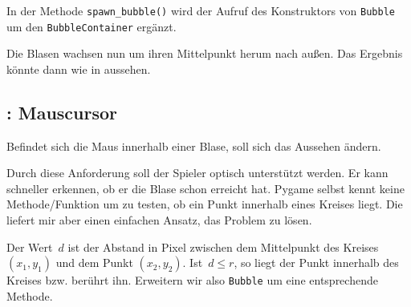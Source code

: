 
In der Methode \texttt{spawn\_bubble()} wird der Aufruf des Konstruktors von \texttt{Bubble} um den \texttt{BubbleContainer} ergänzt.


Die Blasen wachsen nun um ihren Mittelpunkt herum nach außen. Das Ergebnis könnte dann wie in  aussehen.


\subsection{: Mauscursor}
    Befindet sich die Maus innerhalb einer Blase, soll sich das Aussehen ändern.
\er

Durch diese Anforderung soll der Spieler optisch unterstützt werden. Er kann schneller erkennen, ob er die Blase schon erreicht hat. Pygame selbst kennt keine Methode/Funktion um zu testen, ob ein Punkt innerhalb eines Kreises liegt. Die  liefert mir aber einen einfachen Ansatz, das Problem zu lösen. 

Der Wert~$d$ ist der Abstand in Pixel zwischen dem Mittelpunkt des Kreises $(x_1, y_1)$ und dem Punkt $(x_2, y_2)$. Ist~$d \leq r$, so liegt der Punkt innerhalb des Kreises bzw. berührt ihn. Erweitern wir also \texttt{Bubble} um eine entsprechende Methode.

